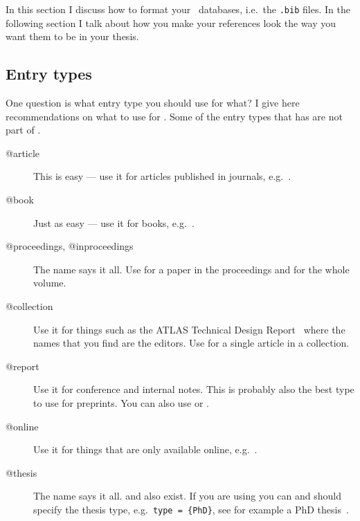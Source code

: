 In this section I discuss how to format your \BibTeX\ databases,
i.e.\ the \texttt{.bib} files. In the following section I talk about
how you make your references look the way you want them to be in your
thesis.

\subsection{Entry types}%
\label{sec:ref:entry}

One question is what entry type you should use for what? I give here
recommendations on what to use for . Some of the entry
types that  has are not part of \BibTeX.

\begin{description}
\item[@article] This is easy --- use it for articles published in
  journals, e.g.~\cite{Abramowicz:2010ih}.
\item[@book] Just as easy --- use it for books, e.g.~\cite{kopka04}.
\item[@proceedings, @inproceedings] The name says it all. Use
   for a paper in the proceedings and
   for the whole volume.
\item[@collection] Use it for things such as the ATLAS Technical Design
  Report~\cite{lhc:vol1} where the names that you find are the
  editors. Use  for a single article in a
  collection.
\item[@report] Use it for conference and
  internal notes. This is
  probably also the best type to use for preprints. You can also use
   or .
\item[@online] Use it for things that are only available online,
  e.g.~\cite{lshort}.
\item[@thesis] The name says it all.
    and
  also exist. If you are using  you can and should specify
  the thesis type, e.g.\ \texttt{type = \{PhD\}}, see for example a
  PhD thesis~\cite{tlodd:2012}.
\end{description}

